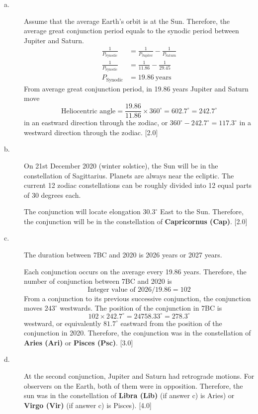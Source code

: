 \begin{description}
\item[a.] Assume that the average Earth's orbit is at the Sun. Therefore, the
  average great conjunction period equals to the synodic period between Jupiter
  and Saturn.
  \begin{align*}
  \frac{1}{P_{\mathrm{Synodic}}} &= \frac{1}{P_{\mathrm{Jupiter}}} - \frac{1}{P_{\mathrm{Saturn}}} \tag*{[3.0]}\\
  \frac{1}{P_{\mathrm{Synodic}}} &= \frac{1}{11.86} - \frac{1}{29.45}\\
  P_{\mathrm{Synodic}} &= 19.86~\text{years} \tag*{[1.0]}
  \end{align*}
  From average great conjunction period, in 19.86 years Jupiter and Saturn move
  \[
  \text{Heliocentric angle} = \frac{19.86}{11.86}\times360^\circ
    = 602.7^\circ = 242.7^\circ
  \]
  in an eastward direction through the zodiac, or
  $360^\circ - 242.7^\circ = 117.3^\circ$ in a westward direction through the
  zodiac. \hfill[2.0]
\item[b.] On 21st December 2020 (winter solstice), the Sun will be in the
  constellation of Sagittarius. Planets are always near the ecliptic. The
  current 12 zodiac constellations can be roughly divided into 12 equal parts
  of 30 degrees each.

  The conjunction will locate elongation $30.3^\circ$ East to the Sun.
  Therefore, the conjunction will be in the constellation of
  \textbf{Capricornus (Cap)}. \hfill[2.0]
\item[c.] The duration between 7BC and 2020 is 2026 years or 2027 years.

  Each conjunction occurs on the average every 19.86 years. Therefore, the
  number of conjunction between 7BC and 2020 is
  \[
  \text{Integer value of } 2026/19.86 = 102 \tag*{[2.0]}
  \]
  From a conjunction to its previous successive conjunction, the conjunction
  moves $243^\circ$ westwards. The position of the conjunction in 7BC is
  \[
  102\times242.7^\circ = 24758.33^\circ = 278.3^\circ \tag*{[3.0]}
  \]
  westward, or equivalently $81.7^\circ$ eastward from the position of the
  conjunction in 2020. Therefore, the conjunction was in the constellation of
  \textbf{Aries (Ari)} or \textbf{Pisces (Psc)}. \hfill[3.0]
\item[d.] At the second conjunction, Jupiter and Saturn had retrograde
  motions. For observers on the Earth, both of them were in opposition.
  Therefore, the sun was in the constellation of \textbf{Libra (Lib)} (if
  answer c) is Aries) or \textbf{Virgo (Vir)} (if answer c) is Pisces).
  \hfill[4.0]
\end{description}

